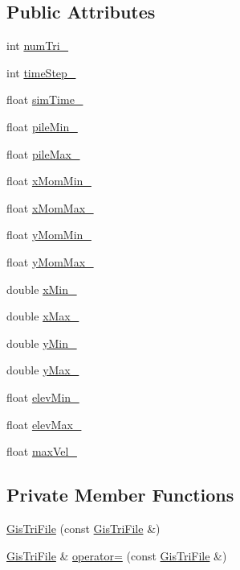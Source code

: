 \subsection*{Public Attributes}
\begin{CompactItemize}
\item 
int \hyperlink{classGisTriFile_o0}{num\-Tri\_\-}
\item 
int \hyperlink{classGisTriFile_o1}{time\-Step\_\-}
\item 
float \hyperlink{classGisTriFile_o2}{sim\-Time\_\-}
\item 
float \hyperlink{classGisTriFile_o3}{pile\-Min\_\-}
\item 
float \hyperlink{classGisTriFile_o4}{pile\-Max\_\-}
\item 
float \hyperlink{classGisTriFile_o5}{x\-Mom\-Min\_\-}
\item 
float \hyperlink{classGisTriFile_o6}{x\-Mom\-Max\_\-}
\item 
float \hyperlink{classGisTriFile_o7}{y\-Mom\-Min\_\-}
\item 
float \hyperlink{classGisTriFile_o8}{y\-Mom\-Max\_\-}
\item 
double \hyperlink{classGisTriFile_o9}{x\-Min\_\-}
\item 
double \hyperlink{classGisTriFile_o10}{x\-Max\_\-}
\item 
double \hyperlink{classGisTriFile_o11}{y\-Min\_\-}
\item 
double \hyperlink{classGisTriFile_o12}{y\-Max\_\-}
\item 
float \hyperlink{classGisTriFile_o13}{elev\-Min\_\-}
\item 
float \hyperlink{classGisTriFile_o14}{elev\-Max\_\-}
\item 
float \hyperlink{classGisTriFile_o15}{max\-Vel\_\-}
\end{CompactItemize}
\subsection*{Private Member Functions}
\begin{CompactItemize}
\item 
\hyperlink{classGisTriFile_d0}{Gis\-Tri\-File} (const \hyperlink{classGisTriFile}{Gis\-Tri\-File} \&)
\item 
\hyperlink{classGisTriFile}{Gis\-Tri\-File} \& \hyperlink{classGisTriFile_d1}{operator=} (const \hyperlink{classGisTriFile}{Gis\-Tri\-File} \&)
\end{CompactItemize}


